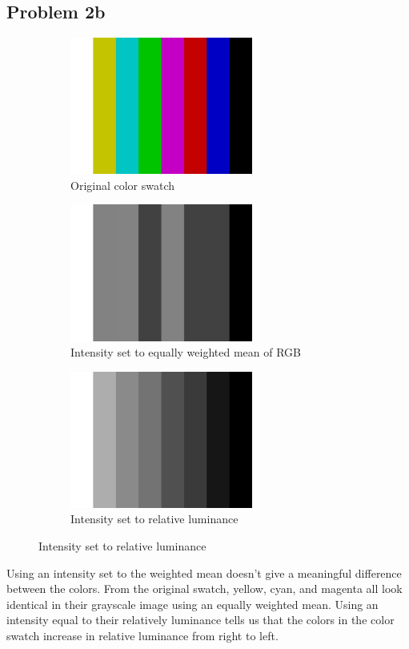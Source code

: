 \documentclass{math}
\begin{document}
\subsection*{Problem 2b}
\begin{figure}[H]
  \begin{subfigure}{0.33\linewidth}
    \centering
    \includegraphics[width=6cm]{assets/hw_01_swatch_original.png}
    \caption{Original color swatch}
  \end{subfigure}
  \begin{subfigure}{0.33\linewidth}
    \centering
    \includegraphics[width=6cm]{assets/hw_01_swatch_mean_grayscale.png}
    \caption{Intensity set to equally weighted mean of RGB}
  \end{subfigure}
  \begin{subfigure}{0.33\linewidth}
    \centering
    \includegraphics[width=6cm]{assets/hw_01_swatch_relative_luminance.png}
    \caption{Intensity set to relative luminance}
  \end{subfigure}
\end{figure}
Using an intensity set to the weighted mean doesn't give a meaningful
difference between the colors. From the original swatch, yellow, cyan, and
magenta all look identical in their grayscale image using an equally weighted
mean. Using an intensity equal to their relatively luminance tells us that
the colors in the color swatch increase in relative luminance from right to
left.
\end{document}
